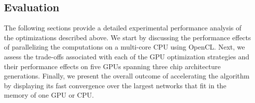 \subsection{Evaluation}
\label{sec-evaluation}

The following sections provide a detailed experimental performance analysis
of the optimizations described above. We start by discussing the performance
effects of parallelizing the computations
on a multi-core CPU using OpenCL.
%
Next, we assess the trade-offs associated with each of the GPU optimization
strategies and their performance effects on five GPUs spanning three chip
architecture generations.
%
Finally, we present the overall outcome of accelerating the algorithm by
displaying its fast convergence over the largest networks that fit in the
memory of one GPU or CPU.




% 


